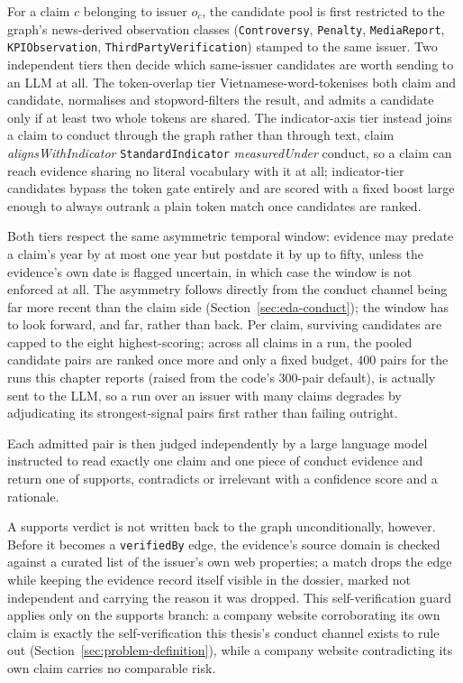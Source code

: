 \documentclass[fontsize=12pt,oneside,headings=small]{scrreprt}
\begin{document}
For a claim $c$ belonging to issuer $o_c$, the candidate pool is first restricted to the graph's news-derived observation classes (\texttt{Controversy}, \texttt{Penalty}, \texttt{MediaReport}, \texttt{KPIObservation}, \texttt{ThirdPartyVerification}) stamped to the same issuer. Two independent tiers then decide which same-issuer candidates are worth sending to an LLM at all. The token-overlap tier Vietnamese-word-tokenises both claim and candidate, normalises and stopword-filters the result, and admits a candidate only if at least two whole tokens are shared. The indicator-axis tier instead joins a claim to conduct through the graph rather than through text, claim \textit{alignsWithIndicator} \texttt{StandardIndicator} \textit{measuredUnder} conduct, so a claim can reach evidence sharing no literal vocabulary with it at all; indicator-tier candidates bypass the token gate entirely and are scored with a fixed boost large enough to always outrank a plain token match once candidates are ranked.

Both tiers respect the same asymmetric temporal window: evidence may predate a claim's year by at most one year but postdate it by up to fifty, unless the evidence's own date is flagged uncertain, in which case the window is not enforced at all. The asymmetry follows directly from the conduct channel being far more recent than the claim side (Section~\ref{sec:eda-conduct}); the window has to look forward, and far, rather than back. Per claim, surviving candidates are capped to the eight highest-scoring; across all claims in a run, the pooled candidate pairs are ranked once more and only a fixed budget, 400 pairs for the runs this chapter reports (raised from the code's 300-pair default), is actually sent to the LLM, so a run over an issuer with many claims degrades by adjudicating its strongest-signal pairs first rather than failing outright.

Each admitted pair is then judged independently by a large language model instructed to read exactly one claim and one piece of conduct evidence and return one of \textsf{supports}, \textsf{contradicts} or \textsf{irrelevant} with a confidence score and a rationale.

A \textsf{supports} verdict is not written back to the graph unconditionally, however. Before it becomes a \texttt{verifiedBy} edge, the evidence's source domain is checked against a curated list of the issuer's own web properties; a match drops the edge while keeping the evidence record itself visible in the dossier, marked not independent and carrying the reason it was dropped. This self-verification guard applies only on the \textsf{supports} branch: a company website corroborating its own claim is exactly the self-verification this thesis's conduct channel exists to rule out (Section~\ref{sec:problem-definition}), while a company website contradicting its own claim carries no comparable risk.
\end{document}
